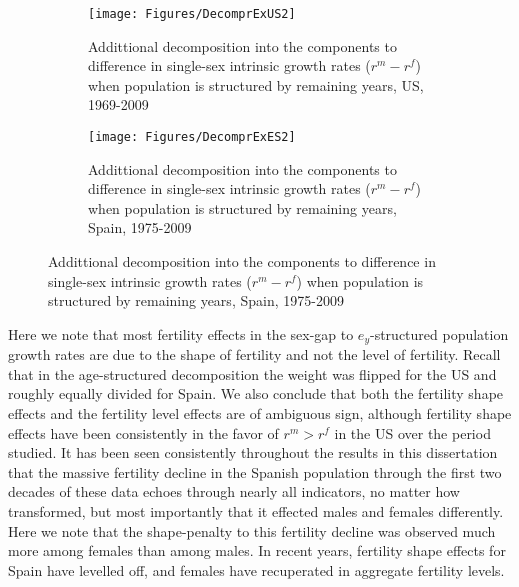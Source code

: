 \begin{figure}
        \centering
        \begin{subfigure}
                \centering
                \caption{Addittional decomposition into the components
                to difference in single-sex intrinsic growth rates
                ($r^m - r^f$) when population is structured by remaining years, US, 1969-2009}
                \texttt{[image: Figures/DecomprExUS2]}
                \label{fig:exDecomprUS2}
        \end{subfigure}
        \begin{subfigure}
                \centering
                \caption{Addittional decomposition into the components to difference in single-sex intrinsic growth
                rates ($r^m - r^f$) when population is structured by remaining
                years, Spain, 1975-2009}
                \texttt{[image: Figures/DecomprExES2]}
                \label{fig:exDecomprES2}
        \end{subfigure}
\end{figure}

 Here we note that most fertility effects in the sex-gap to $e_y$-structured
 population growth rates are due to the shape of fertility and not the level of
 fertility. Recall that in the age-structured decomposition the weight was
 flipped for the US and roughly equally divided for Spain. We also conclude that
 both the fertility shape effects and the fertility level effects are of
 ambiguous sign, although fertility shape effects have been
 consistently in the favor of $r^m > r^f$ in the US over the period studied. It
 has been seen consistently throughout the results in this dissertation that
 the massive fertility decline in the Spanish population through the first two
 decades of these data echoes through nearly all indicators, no matter how
 transformed, but most importantly that it effected males and females differently. 
 Here we note that the shape-penalty to
 this fertility decline was observed much more among females than among males.
 In recent years, fertility shape effects for Spain have levelled off, and
 females have recuperated in aggregate fertility levels.
 
